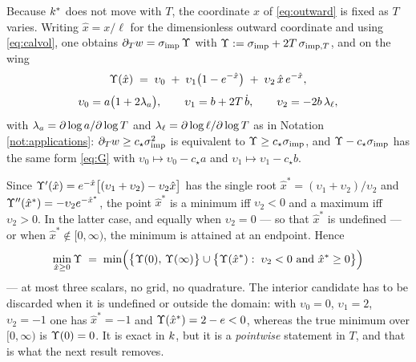 Because $k^{*}$ does not move with $T$, the coordinate $x$ of \eqref{eq:outward} is fixed as $T$
varies. Writing $\hat{x}=x/\ell$ for the dimensionless outward coordinate and using
\eqref{eq:calvol}, one obtains $\partial_{T}w=\sigma_{\mathrm{imp}}\,\Upsilon$ with
$\Upsilon:=\sigma_{\mathrm{imp}}+2T\,\sigma_{\mathrm{imp},T}$, and on the wing
\begin{equation}
  \Upsilon(\hat{x})\;=\;\upsilon_{0}\;+\;\upsilon_{1}\bigl(1-e^{-\hat{x}}\bigr)\;+\;\upsilon_{2}\,\hat{x}\,e^{-\hat{x}},
  \label{eq:G}
\end{equation}
\begin{equation}\label{eq:Gcoeffs}
  \upsilon_{0}=a\bigl(1+2\lambda_{a}\bigr),\qquad
  \upsilon_{1}=b+2T\,\dot b,\qquad
  \upsilon_{2}=-2b\,\lambda_{\ell},
\end{equation}
with $\lambda_{a}=\partial\log a/\partial\log T$ and $\lambda_{\ell}=\partial\log\ell/\partial\log T$ as in
Notation \ref{not:applications}: $\partial_{T}w\ge c_{\star}\sigma_{\mathrm{imp}}^{2}$ is
equivalent to $\Upsilon\ge c_{\star}\sigma_{\mathrm{imp}}$, and $\Upsilon-c_{\star}\sigma_{\mathrm{imp}}$ has the same form
\eqref{eq:G} with $\upsilon_{0}\mapsto\upsilon_{0}-c_{\star}a$ and
$\upsilon_{1}\mapsto\upsilon_{1}-c_{\star}b$.

Since $\Upsilon'(\hat{x})=e^{-\hat{x}}\bigl[(\upsilon_{1}+\upsilon_{2})-\upsilon_{2}\hat{x}\bigr]$
has the single root $\hat{x}^{*}=(\upsilon_{1}+\upsilon_{2})/\upsilon_{2}$ and
$\Upsilon''(\hat{x}^{*})=-\upsilon_{2}e^{-\hat{x}^{*}}$, the point $\hat{x}^{*}$ is a minimum iff
$\upsilon_{2}<0$ and a maximum iff $\upsilon_{2}>0$. In the latter case, and equally when
$\upsilon_{2}=0$ --- so that $\hat{x}^{*}$ is undefined --- or when $\hat{x}^{*}\notin[0,\infty)$,
the minimum is attained at an endpoint. Hence
\begin{equation}\label{eq:threescalars}
  \min_{\hat{x}\ge0}\Caldrift \;=\; \min\Bigl(\bigl\{\Caldrift(0),\,\Caldrift(\infty)\bigr\}\cup
  \bigl\{\Caldrift(\hat{x}^{*}):\;\upsilon_{2}<0\ \text{and}\ \hat{x}^{*}\ge0\bigr\}\Bigr)
\end{equation}
--- at most three scalars, no grid, no quadrature. The interior candidate has to be discarded when it
is undefined or outside the domain: with $\upsilon_{0}=0$, $\upsilon_{1}=2$, $\upsilon_{2}=-1$ one
has $\hat{x}^{*}=-1$ and $\Upsilon(\hat{x}^{*})=2-e<0$, whereas the true minimum over $[0,\infty)$
is $\Upsilon(0)=0$. It is exact in $k$, but it is a
\emph{pointwise} statement in $T$, and that is what the next result removes.

